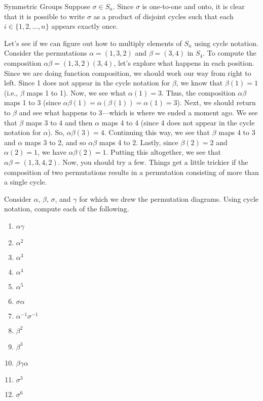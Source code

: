 \begin{section}{Symmetric Groups}
Suppose $\sigma\in S_n$.  Since $\sigma$ is one-to-one and onto, it is clear that it is possible to write $\sigma$ as a product of disjoint cycles such that each $i\in\{1,2,\ldots, n\}$ appears exactly once.

Let's see if we can figure out how to multiply elements of $S_n$ using cycle notation.  Consider the permutations $\alpha=(1,3,2)$ and $\beta=(3,4)$ in $S_4$.  To compute the composition $\alpha\beta=(1,3,2)(3,4)$, let's explore what happens in each position.  Since we are doing function composition, we should work our way from right to left.  Since 1 does not appear in the cycle notation for $\beta$, we know that $\beta(1)=1$ (i.e., $\beta$ maps 1 to 1).  Now, we see what $\alpha(1)=3$.  Thus, the composition $\alpha\beta$ maps 1 to 3 (since $\alpha\beta(1)=\alpha(\beta(1))=\alpha(1)=3$).  Next, we should return to $\beta$ and see what happens to 3---which is where we ended a moment ago.  We see that $\beta$ maps 3 to 4 and then $\alpha$ maps 4 to 4 (since 4 does not appear in the cycle notation for $\alpha$).  So, $\alpha\beta(3)=4$.  Continuing this way, we see that $\beta$ maps 4 to 3 and $\alpha$ maps 3 to 2, and so $\alpha\beta$ maps 4 to 2.  Lastly, since $\beta(2)=2$ and $\alpha(2)=1$, we have $\alpha\beta(2)=1$.  Putting this altogether, we see that $\alpha\beta=(1,3,4,2)$.  Now, you should try a few.  Things get a little trickier if the composition of two permutations results in a permutation consisting of more than a single cycle.

\begin{exercise}
Consider $\alpha$, $\beta$, $\sigma$, and $\gamma$ for which we drew the permutation diagrams.  Using cycle notation, compute each of the following.
\begin{multicols}{2}
\begin{enumerate}[label=\rm{(\alph*)}]
\item $\alpha\gamma$
\item $\alpha^2$
\item $\alpha^3$
\item $\alpha^4$
\item $\alpha^5$
\item $\sigma\alpha$
\item $\alpha^{-1}\sigma^{-1}$
\item $\beta^2$
\item $\beta^3$
\item $\beta\gamma\alpha$
\item $\sigma^3$
\item $\sigma^6$
\end{enumerate}
\end{multicols}
\end{exercise}


\end{section}
